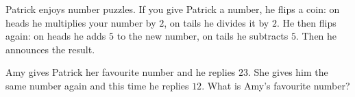 Patrick enjoys number puzzles. If you give Patrick a number, he flips a coin: on heads he multiplies your number by $2$, on tails he divides it by $2$. He then flips again: on heads he adds $5$ to the new number, on tails he subtracts $5$. Then he announces the result.

Amy gives Patrick her favourite number and he replies $23$. She gives him the same number again and this time he replies $12$. What is Amy's favourite number?
